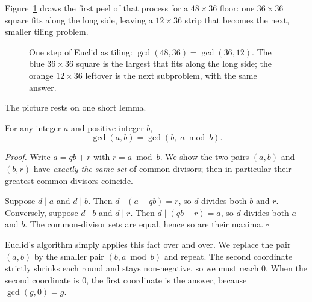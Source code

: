 Figure~\ref{ch30:fig-tiling} draws the first peel of that process for a
$48 \times 36$ floor: one $36 \times 36$ square fits along the long side, leaving
a $12 \times 36$ strip that becomes the next, smaller tiling problem.

\begin{figure}[H]
\centering
{}
\caption{One step of Euclid as tiling: $\gcd(48,36)=\gcd(36,12)$. The blue
$36\times 36$ square is the largest that fits along the long side; the orange
$12\times 36$ leftover is the next subproblem, with the same answer.}
\label{ch30:fig-tiling}
\end{figure}

The picture rests on one short lemma.

\begin{theorem}
\label{ch30:thm-euclid}
For any integer $a$ and positive integer $b$,
\[
  \gcd(a,b) = \gcd(b,\; a \bmod b).
\]
\end{theorem}

\begin{formalbox}
\textit{Proof.} Write $a = q b + r$ with $r = a \bmod b$. We show the two pairs
$(a,b)$ and $(b,r)$ have \emph{exactly the same set} of common divisors; then in
particular their greatest common divisors coincide.

Suppose $d \mid a$ and $d \mid b$. Then $d \mid (a - qb) = r$, so $d$ divides
both $b$ and $r$. Conversely, suppose $d \mid b$ and $d \mid r$. Then $d \mid
(qb + r) = a$, so $d$ divides both $a$ and $b$. The common-divisor sets are
equal, hence so are their maxima. \hfill$\square$
\end{formalbox}

Euclid's algorithm simply applies this fact over and over. We replace
the pair $(a,b)$ by the smaller pair $(b, a \bmod b)$ and repeat. The second
coordinate strictly shrinks each round and stays non-negative, so we must reach
$0$. When the second coordinate is $0$, the first coordinate is the answer,
because $\gcd(g, 0) = g$.

